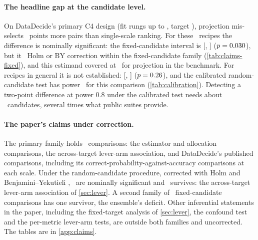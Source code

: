 \documentclass{article}
\begin{document}
\paragraph{The headline gap at the candidate level.} On DataDecide's primary
C4 design (fit rungs up to \primaryFitTop, target \primaryTarget), projection mis-selects
\headEstimate\ points more pairs than single-scale ranking. For these
\nCandidates\ recipes the difference is nominally significant: the
fixed-candidate interval is [\headFixedLow, \headFixedHigh] ($p=0.030$),
but it \headFixedFamilyVerdict\ Holm or BY correction within the fixed-candidate
family (\cref{tab:claims-fixed}), and this estimand covered at
\calProjFixedCov\ for projection in the benchmark. For recipes in general it is
not established: [\headRandomLow, \headRandomHigh] ($p=0.26$), and the
calibrated random-candidate test has power \calHeadRandomPower\ for this
comparison (\cref{tab:calibration}).
Detecting a two-point difference at power 0.8 under the calibrated test needs  %
about \candShrunkTwo\ candidates, several times what public suites provide.

\paragraph{The paper's claims under correction.} The primary family holds
\restatedPrimaryM\ comparisons: the estimator and allocation comparisons, the
across-target lever-arm association, and DataDecide's published comparisons,
including its correct-probability-against-accuracy comparisons at each scale.
Under the random-candidate procedure, corrected with Holm
\citep{holm1979simple} and Benjamini--Yekutieli
\citep{benjamini2001control}, \restatedPrimaryNominal\ are nominally
significant and \restatedPrimaryBY\ survives: the across-target lever-arm
association of \cref{sec:lever}. A second family of \restatedFixedM\
fixed-candidate comparisons has one survivor, the ensemble's deficit. Other
inferential statements in the paper, including the fixed-target analysis of
\cref{sec:lever}, the confound test and the per-metric lever-arm tests, are
outside both families and uncorrected. The tables are in \cref{app:claims}.
\end{document}
